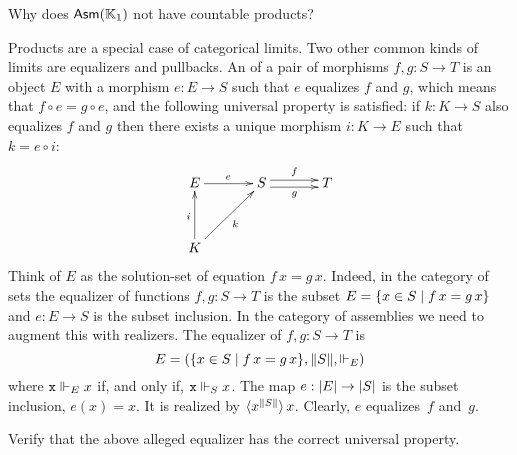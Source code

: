 \begin{exercise}
  Why does $\Asm{\klone}$ not have countable products?
\end{exercise}

Products are a special case of categorical limits. Two other common
kinds of limits are equalizers and pullbacks. An  of a
pair of morphisms $f, g : S \to T$ is an object $E$ with a morphism $e
: E \to S$ such that $e$ equalizes $f$ and $g$, which means that $f
\circ e = g \circ e$, and the following universal property is
satisfied: if $k : K \to S$ also equalizes $f$ and $g$ then there
exists a unique morphism $i : K \to E$ such that $k = e \circ i$:
%
\begin{equation*}
  \xymatrix@+1em{
    {E}
    \ar[r]^{e}
    &
    {S}
    \ar@<+0.25em>[r]^{f}
    \ar@<-0.25em>[r]_{g}
    &
    {T}
    \\
    {K}
    \ar[u]^{i}
    \ar[ru]_{k}
    & & 
  }
\end{equation*}
%
Think of $E$ as the solution-set of equation $f\,x =
g\,x$.
%
Indeed, in the category of sets the equalizer of functions $f, g : S
\to T$ is the subset $E = \set{x \in S \such f\,x = g\,x}$ and $e : E
\to S$ is the subset inclusion. In the category of assemblies we need
to augment this with realizers. The equalizer of $f, g : S \to
T$ is
%
\begin{equation}
  \label{eq:asm-equalizer}%
  E =
  (\set{x \in S \such f\,x = g\,x},
   \T{S},
   {\rz[E]})
\end{equation}
%
where $\R{x} \rz[E] x$ if, and only if, $\R{x} \rz[S] x$. The map $e : \S{E}
\to \S{S}$ is the subset inclusion, $e(x) = x$. It is realized by
$\tpcalam{x}{\T{S}} x$. Clearly, $e$ equalizes~$f$ and~$g$.

\begin{exercise}
  Verify that the above alleged equalizer has the correct universal property.
\end{exercise}

